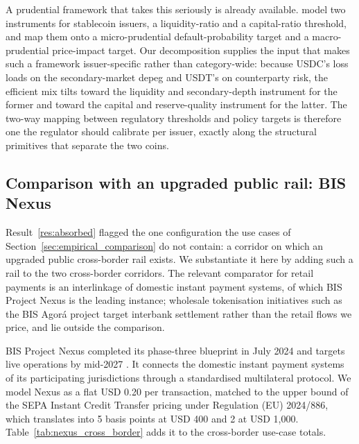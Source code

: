 A prudential framework that takes this seriously is already available. \citet{goel_lewrick_agarwal_2026} model two instruments for stablecoin issuers, a liquidity-ratio and a capital-ratio threshold, and map them onto a micro-prudential default-probability target and a macro-prudential price-impact target. Our decomposition supplies the input that makes such a framework issuer-specific rather than category-wide: because USDC's loss loads on the secondary-market depeg and USDT's on counterparty risk, the efficient mix tilts toward the liquidity and secondary-depth instrument for the former and toward the capital and reserve-quality instrument for the latter. The two-way mapping between regulatory thresholds and policy targets is therefore one the regulator should calibrate per issuer, exactly along the structural primitives that separate the two coins.

\subsection{Comparison with an upgraded public rail: BIS Nexus}\label{sub:public_trajectory}

Result~\ref{res:absorbed} flagged the one configuration the use cases of Section~\ref{sec:empirical_comparison} do not contain: a corridor on which an upgraded public cross-border rail exists. We substantiate it here by adding such a rail to the two cross-border corridors. The relevant comparator for retail payments is an interlinkage of domestic instant payment systems, of which BIS Project Nexus is the leading instance; wholesale tokenisation initiatives such as the BIS Agor\'a project target interbank settlement rather than the retail flows we price, and lie outside the comparison.

BIS Project Nexus completed its phase-three blueprint in July 2024 and targets live operations by mid-2027 \citep{bis_nexus_2024}. It connects the domestic instant payment systems of its participating jurisdictions through a standardised multilateral protocol. We model Nexus as a flat USD 0.20 per transaction, matched to the upper bound of the SEPA Instant Credit Transfer pricing under Regulation (EU) 2024/886, which translates into 5 basis points at USD 400 and 2 at USD 1{,}000. Table~\ref{tab:nexus_cross_border} adds it to the cross-border use-case totals.

